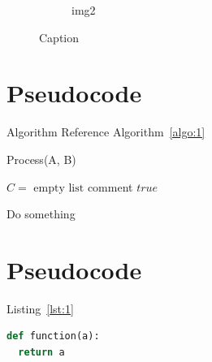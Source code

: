 \documentclass[english]{article}
\begin{document}
\begin{figure}[!htb]
\begin{subfigure}{.45\textwidth}
    \centering
    \caption{img2}
    \label{fig:1.2}
  \end{subfigure}
  \centering
  \caption{Caption}
  \label{fig:1}
\end{figure}

\clearpage
\pagebreak
\section{Pseudocode}

\par Algorithm Reference Algorithm~\ref{algo:1}

\begin{algorithm}
  \caption{Process(A, B)}\label{algo:1}
  \begin{algorithmic}[1]

    \State $C = \text{ empty list}$ \Comment comment
    \State \Return $true$
    \Else

    \State Do something
    \EndWhile

    \EndIf

  \end{algorithmic}
\end{algorithm}

\clearpage
\pagebreak
\section{Pseudocode}

Listing~\ref{lst:1}

\begin{lstlisting}[language=Python, caption=Caption, label=lst:1]
def function(a):
  return a
\end{lstlisting}


\clearpage
\pagebreak
\printbibliography
\end{document}
